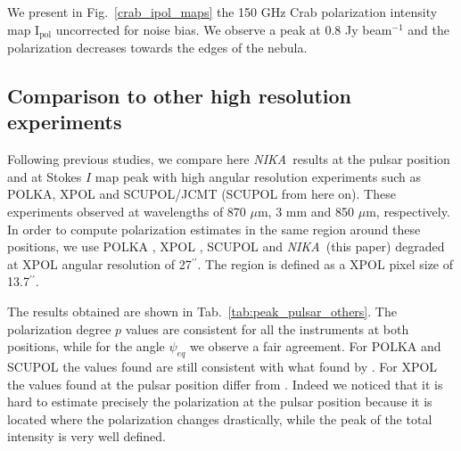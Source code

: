 \documentclass[twocolumn,traditabstract]{aa}
\def\NIKA{\textit{NIKA}}
\begin{document}
We present in Fig.~\ref{crab_ipol_maps} the 150 GHz Crab polarization intensity
map ${\textrm{I}_{\textrm{pol}}}$ uncorrected for noise bias. We observe a peak at 0.8 Jy beam$^{-1}$ and the polarization
decreases towards the edges of the nebula.

\subsection{Comparison to other high resolution experiments}
Following previous studies, we compare here \NIKA\ results at the pulsar position and at Stokes $I$ map peak with high angular resolution experiments such as POLKA, XPOL and SCUPOL/JCMT (SCUPOL from here on). These experiments observed at wavelengths of 870 $\mu$m, 3 mm and 850 $\mu$m, respectively.
In order to compute polarization estimates in the same region around these positions, we use POLKA \citep{2014PASP..126.1027W}, XPOL \citep{aumont2010}, SCUPOL \citep{scubapol} and \NIKA\ (this paper) degraded at XPOL angular resolution of 27$^{\prime\prime}$. The region is defined as a XPOL pixel size of 13.7$^{\prime\prime}$.

The results obtained are shown in Tab.~\ref{tab:peak_pulsar_others}. The polarization degree $p$ values are consistent for all the instruments at both positions, while for the angle $\psi_{eq}$ we observe a fair agreement. For POLKA and SCUPOL the values found are still consistent with what found by \citep{2014PASP..126.1027W}.
For XPOL the values found at the pulsar position differ from \citep{aumont2010}. Indeed we noticed that it is hard to estimate precisely the polarization at the pulsar position because it is located where the polarization changes drastically, while the peak of the total intensity is very well defined. 
\end{document}
